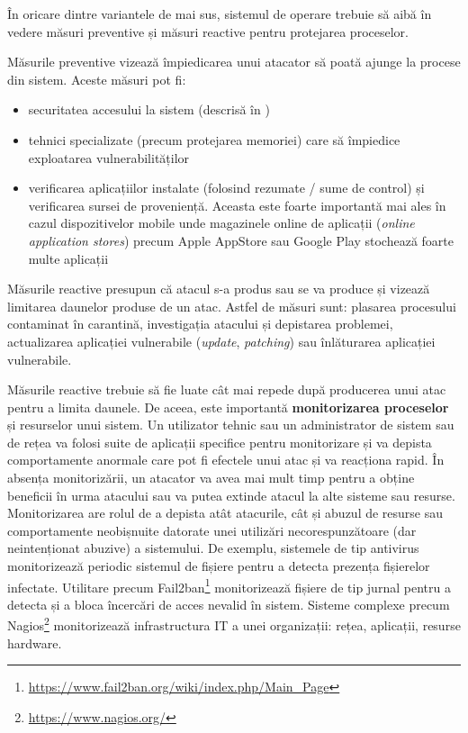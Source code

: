 În oricare dintre variantele de mai sus, sistemul de operare trebuie să aibă în vedere măsuri preventive și măsuri reactive pentru protejarea proceselor.

Măsurile preventive vizează împiedicarea unui atacator să poată ajunge la procese din sistem. Aceste măsuri pot fi:

\begin{itemize}
  \item securitatea accesului la sistem (descrisă în )
  \item tehnici specializate (precum protejarea memoriei) care să împiedice exploatarea vulnerabilităților
  \item verificarea aplicațiilor instalate (folosind rezumate / sume de control) și verificarea sursei de proveniență. Aceasta este foarte importantă mai ales în cazul dispozitivelor mobile unde magazinele online de aplicații (\textit{online application stores}) precum Apple AppStore sau Google Play stochează foarte multe aplicații
\end{itemize}

Măsurile reactive presupun că atacul s-a produs sau se va produce și vizează limitarea daunelor produse de un atac. Astfel de măsuri sunt: plasarea procesului contaminat în carantină, investigația atacului și depistarea problemei, actualizarea aplicației vulnerabile (\textit{update}, \textit{patching}) sau înlăturarea aplicației vulnerabile.

Măsurile reactive trebuie să fie luate cât mai repede după producerea unui atac pentru a limita daunele. De aceea, este importantă \textbf{monitorizarea proceselor} și resurselor unui sistem. Un utilizator tehnic sau un administrator de sistem sau de rețea va folosi suite de aplicații specifice pentru monitorizare și va depista comportamente anormale care pot fi efectele unui atac și va reacționa rapid. În absența monitorizării, un atacator va avea mai mult timp pentru a obține beneficii în urma atacului sau va putea extinde atacul la alte sisteme sau resurse. Monitorizarea are rolul de a depista atât atacurile, cât și abuzul de resurse sau comportamente neobișnuite datorate unei utilizări necorespunzătoare (dar neintenționat abuzive) a sistemului. De exemplu, sistemele de tip antivirus monitorizează periodic sistemul de fișiere pentru a detecta prezența fișierelor infectate. Utilitare precum Fail2ban\footnote{\url{https://www.fail2ban.org/wiki/index.php/Main\_Page}} monitorizează fișiere de tip jurnal pentru a detecta și a bloca încercări de acces nevalid în sistem. Sisteme complexe precum Nagios\footnote{\url{https://www.nagios.org/}} monitorizează infrastructura IT a unei organizații: rețea, aplicații, resurse hardware.


